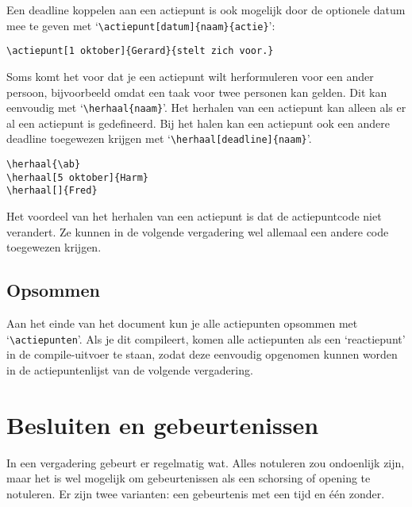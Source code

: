 \documentclass[a4paper]{notulen}
\begin{document}
			Een deadline koppelen aan een actiepunt is ook mogelijk door de optionele datum mee te geven met `\lstinline!\actiepunt[datum]{naam}{actie}!':
			
			
			\begin{lstlisting}
\actiepunt[1 oktober]{Gerard}{stelt zich voor.}
			\end{lstlisting}
			
			Soms komt het voor dat je een actiepunt wilt herformuleren voor een ander persoon, bijvoorbeeld omdat een taak voor twee personen kan 
			gelden. Dit kan eenvoudig met `\lstinline!\herhaal{naam}!'. Het herhalen van een actiepunt kan alleen als er al een actiepunt is
			gedefineerd. Bij het halen kan een actiepunt ook een andere deadline toegewezen krijgen met `\lstinline!\herhaal[deadline]{naam}!'.
			
			\herhaal{\ab}
			
			\begin{lstlisting}
\herhaal{\ab}
\herhaal[5 oktober]{Harm}
\herhaal[]{Fred}
			\end{lstlisting}
			
			Het voordeel van het herhalen van een actiepunt is dat de actiepuntcode niet verandert. Ze kunnen in de volgende vergadering wel allemaal
			een andere code toegewezen krijgen.
			
		\subsection{Opsommen}
			Aan het einde van het document kun je alle actiepunten opsommen met `\lstinline!\actiepunten!'. Als je dit compileert, komen alle actiepunten
			als een `reactiepunt' in de compile-uitvoer te staan, zodat deze eenvoudig opgenomen kunnen worden in de actiepuntenlijst van de volgende
			vergadering.
			
	\section{Besluiten en gebeurtenissen}
		In een vergadering gebeurt er regelmatig wat. Alles notuleren zou ondoenlijk zijn, maar het is wel mogelijk om gebeurtenissen als een
		schorsing of opening te notuleren. Er zijn twee varianten: een gebeurtenis met een tijd en \'e\'en zonder.
		
		
\end{document}
